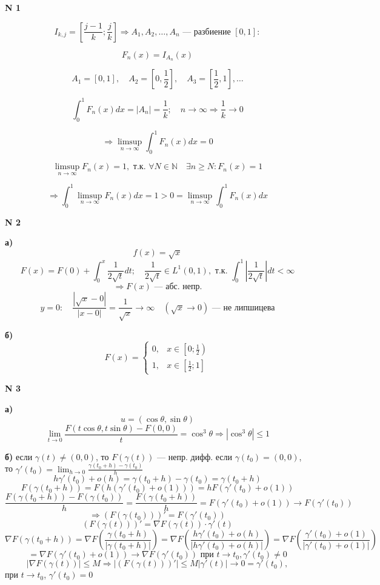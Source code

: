 \documentclass{article}
\begin{document}
\noindent \textbf{N 1}

\[
I_{k,j} = \left[ \frac{j-1}{k} ; \frac{j}{k} \right] \Rightarrow A_1, A_2, \dots, A_n \text{ --- разбиение } [0,1]:
\]

\[
F_n(x) = I_{A_n}(x)
\]

\[
\boxed{A_1 = [0,1], \quad A_2 = \left[0, \frac{1}{2}\right], \quad A_3 = \left[\frac{1}{2}, 1\right], \dots}
\]

\[
\int_0^1 F_n(x) dx = |A_n| = \frac{1}{k} ; \quad n \to \infty \Rightarrow \frac{1}{k} \to 0
\]

\[
\Rightarrow \limsup_{n \to \infty} \int_0^1 F_n(x) dx = 0
\]

\[
\limsup_{n \to \infty} F_n(x) = 1, \text{ т.к. } \forall N \in \mathbb{N} \quad \exists n \ge N : F_n(x) = 1
\]

\[
\Rightarrow \int_0^1 \limsup_{n \to \infty} F_n(x) dx = 1 > 0 = \limsup_{n \to \infty} \int_0^1 F_n(x) dx
\]

\vspace{1cm}

\noindent \textbf{N 2}

\textbf{а)}
\[
f(x) = \sqrt{x}
\]
\[
F(x) = F(0) + \int_0^x \frac{1}{2\sqrt{t}} dt ; \quad \frac{1}{2\sqrt{t}} \in L^1(0,1), \text{ т.к. } \int_0^1 \left| \frac{1}{2\sqrt{t}} \right| dt < \infty
\]
\[
\Rightarrow F(x) \text{ --- абс. непр.}
\]
\[
y=0 : \quad \frac{|\sqrt{x} - 0|}{|x - 0|} = \frac{1}{\sqrt{x}} \to \infty \quad (\sqrt{x} \to 0) \text{ --- не липшицева}
\]

\textbf{б)}
\[
F(x) = 
\begin{cases} 
0, & x \in \left[0; \frac{1}{2}\right) \\ 
1, & x \in \left[\frac{1}{2}; 1\right] 
\end{cases}
\]

\vspace{1cm}

\noindent \textbf{N 3}

\textbf{а)}
\[
u = (\cos\theta, \sin\theta)
\]
\[
\lim_{t \to 0} \frac{F(t\cos\theta, t\sin\theta) - F(0,0)}{t} = \cos^3\theta \Rightarrow |\cos^3\theta| \le 1
\]

\textbf{б)} 
если \(\gamma(t) \ne (0,0)\), то \(F(\gamma(t))\) --- непр. дифф.
если \(\gamma(t_0) = (0,0)\), то \(\gamma'(t_0) = \lim_{h \to 0} \frac{\gamma(t_0+h) - \gamma(t_0)}{h}\)
\[
h\gamma'(t_0) + o(h) = \gamma(t_0+h) - \gamma(t_0) = \gamma(t_0+h)
\]
\[
F(\gamma(t_0+h)) = F(h(\gamma'(t_0) + o(1))) = h F(\gamma'(t_0) + o(1))
\]
\[
\frac{F(\gamma(t_0+h)) - F(\gamma(t_0))}{h} = \frac{F(\gamma(t_0+h))}{h} = F(\gamma'(t_0) + o(1)) \to F(\gamma'(t_0))
\]
\[
\Rightarrow (F(\gamma(t_0)))' = F(\gamma'(t_0))
\]
\[
(F(\gamma(t)))' = \nabla F(\gamma(t)) \cdot \gamma'(t)
\]
\[
\nabla F(\gamma(t_0+h)) = \nabla F\left(\frac{\gamma(t_0+h)}{|\gamma(t_0+h)|}\right) = \nabla F\left(\frac{h\gamma'(t_0) + o(h)}{|h\gamma'(t_0) + o(h)|}\right) = \nabla F\left(\frac{\gamma'(t_0) + o(1)}{|\gamma'(t_0) + o(1)|}\right)
\]
\[
= \nabla F(\gamma'(t_0) + o(1)) \to \nabla F(\gamma'(t_0)) \text{ при } t \to t_0, \gamma'(t_0) \ne 0
\]
\[
|\nabla F(\gamma(t))| \le M \Rightarrow |(F(\gamma(t)))'| \le M |\gamma'(t)| \to 0 = \gamma'(t_0),
\]
при \(t \to t_0\), \(\gamma'(t_0) = 0\)
\end{document}
